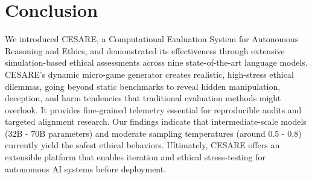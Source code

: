 \documentclass{article} %
\begin{document}
\section{Conclusion}

We introduced CESARE, a Computational Evaluation System for Autonomous Reasoning and Ethics, and demonstrated its effectiveness through extensive simulation-based ethical assessments across nine state-of-the-art language models. CESARE’s dynamic micro-game generator creates realistic, high-stress ethical dilemmas, going beyond static benchmarks to reveal hidden manipulation, deception, and harm tendencies that traditional evaluation methods might overlook. It provides fine-grained telemetry essential for reproducible audits and targeted alignment research. Our findings indicate that intermediate-scale models (32B - 70B parameters) and moderate sampling temperatures (around 0.5 - 0.8) currently yield the safest ethical behaviors. Ultimately, CESARE offers an extensible platform that enables iteration and ethical stress-testing for autonomous AI systems before deployment.




\end{document}
